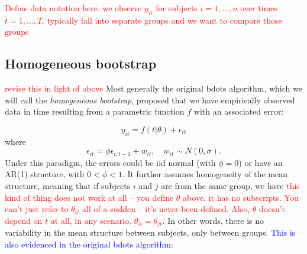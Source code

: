 \documentclass{article}
\providecommand{\pb}[1]{\textcolor{red}{#1}}
\providecommand{\cn}[1]{\textcolor{blue}{#1}}
\begin{document}
\pb{Define data notation here. we observe $y_{it}$ for subjects $i=1, \ldots, n$ over times $t=1, \ldots, T$. typically fall into separate groups and we want to compare those groups}

\subsection{Homogeneous bootstrap}

\pb{revise this in light of above} Most generally the original bdots algorithm, which we will call the \textit{homogeneous bootstrap}, proposed that we have empirically observed data in time resulting from a parametric function $f$ with an associated error: 

\begin{equation}\label{eq:mean_structure}
y_{it} = f(t|\theta) + \epsilon_{it}
\end{equation}
where 
\begin{equation}
\epsilon_{it} = \phi \epsilon_{i, t-1} + w_{it}, \quad w_{it} \sim N(0, \sigma).
\end{equation}
Under this paradigm, the errors could be iid normal (with $\phi = 0$) or have an AR(1) structure, with $0 < \phi < 1$. It further assumes homogeneity of the mean structure, meaning that if subjects $i$ and $j$ are from the same group, we have \pb{this kind of thing does not work at all -- you define $\theta$ above. it has no subscripts. You can't just refer to $\theta_{it}$ all of a sudden -- it's never been defined. Also, $\theta$ doesn't depend on $t$ at all, in any scenario. $\theta_{it} = \theta_{jt}$}. In other words, there is no variability in the mean structure between subjects, only between groups. \cn{This is also evidenced in the original bdots algorithm: }
\end{document}
